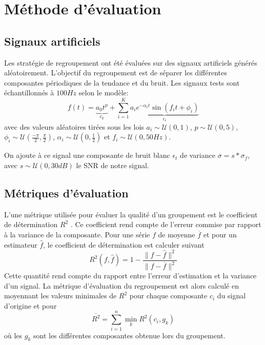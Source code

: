 \documentclass{gretsi}
\begin{document}

\section{Méthode d'évaluation}
\label{sec:eval}

\subsection{Signaux artificiels}
\label{sub:artsig}

    Les stratégie de regroupement ont été évaluées sur des signaux artificiels générés aléatoirement. L'objectif du regroupement est de séparer les différentes composantes périodiques de la tendance et du bruit. Les signaux tests sont échantillonnés à $100Hz$ selon le modèle:
    \begin{equation}\label{eq:artsig}
    f(t) = \underbrace{a_0 t^p}_{c_0} + \sum_{i=1}^K \underbrace{a_i e^{-\alpha_i t} \sin\left(f_i t + \phi_i\right)}_{c_i}
    \end{equation} avec des valeurs aléatoires tirées sous les lois $a_i \sim \mathcal U(0, 1)$, $p \sim \mathcal U(0, 5)$, $\displaystyle \phi_i \sim \mathcal U\left(\frac{-\pi}{2}, \frac{\pi}{2}\right)$, $\alpha_i \sim \mathcal U\left(0, \frac{1}{2}\right)$ et $f_i \sim \mathcal U(0, 50Hz)$.
    
    On ajoute à ce signal une composante de bruit blanc $\epsilon_t$ de variance $\sigma = s*\sigma_f$, avec $s \sim \mathcal U(0, 30dB)$ le SNR de notre signal.


\subsection{Métriques d'évaluation}
\label{sub:met}

    L'une métrique utilisée pour évaluer la qualité d'un groupement est le coefficient de détermination $R^2$ \cite{abalov_14_auto}. Ce coefficient rend compte de l'erreur commise par rapport à la variance de la composante. Pour une série $f$ de moyenne $\overline f$ et pour un estimateur $\widehat f$, le coefficient de détermination est calculer suivant
    $$
        R^2(f, \widehat f) = 1 - \frac{\|f-\widehat f\|^2}{\|f-\overline f\|^2}
    $$Cette quantité rend compte du rapport entre l'erreur d'estimation et la variance d'un signal. La métrique d'évaluation du regroupement est alors calculé en moyennant les valeurs minimales de $R^2$ pour chaque composante $c_i$ du signal d'origine et pour 
    $$
        \overline{ R^2} = \sum_{i=1}^n \min_k R^2(c_i, g_k)
    $$où les $g_k$ sont les différentes composantes obtenue lors du groupement.
    
\end{document}
